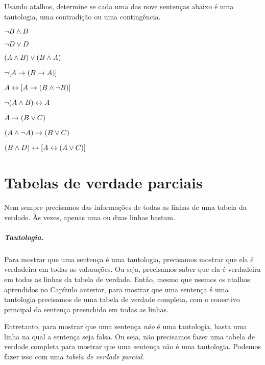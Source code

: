 \practiceproblems
\problempart
\label{pr.TT.TTorC2}
Usando atalhos, determine se cada uma das nove sentenças abaixo é uma tautologia, uma contradição ou uma contingência.
\begin{earg}
\item $\neg B \wedge B$ %
\item $\neg D \vee D$ %
\item $(A\wedge B) \vee (B\wedge A)$ %
\item $\neg[A \rightarrow (B \rightarrow A)]$ %
\item $A \leftrightarrow [A \rightarrow (B \wedge \neg B)]$ %
\item $\neg(A\wedge B) \leftrightarrow A$ %
\item $A\rightarrow(B\vee C)$ %
\item $(A \wedge\neg A) \rightarrow (B \vee C)$ %
\item $(B\wedge D) \leftrightarrow [A \leftrightarrow(A \vee C)]$%
\end{earg}


\chapter{Tabelas de verdade parciais}\label{s:PartialTruthTable}

Nem sempre precisamos das informações de todas as linhas de uma tabela da verdade.
Às vezes, apenas uma ou duas linhas bastam.

\paragraph{Tautologia.} 
Para mostrar que uma sentença é uma tautologia, precisamos mostrar que ela é verdadeira em todas as valorações.
Ou seja, precisamos saber que ela é verdadeira em todas as linhas da tabela de verdade.
Então, mesmo que usemos os atalhos aprendidos no Capítulo anterior, para mostrar que uma sentença é uma tautologia precisamos de uma tabela de verdade completa, com o conectivo principal da sentença preenchido em todas as linhas.

Entretanto, para mostrar que uma sentença \emph{não} é uma tautologia, basta uma linha na qual a sentença seja falsa.
Ou seja, não precisamos fazer uma tabela de verdade completa para mostrar que uma sentença não é uma tautologia.
Podemos fazer isso  com uma \emph{tabela de verdade parcial}.

